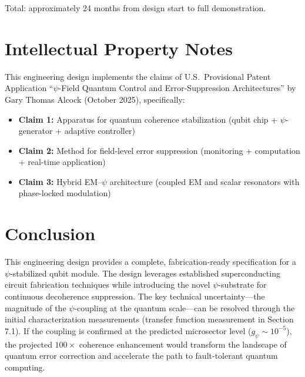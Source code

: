 \documentclass[11pt,letterpaper]{article}
\begin{document}
Total: approximately 24 months from design start to full demonstration.

\section{Intellectual Property Notes}

This engineering design implements the claims of U.S.\ Provisional Patent
Application ``$\psi$-Field Quantum Control and Error-Suppression
Architectures'' by Gary Thomas Alcock (October 2025), specifically:

\begin{itemize}
\item \textbf{Claim 1:} Apparatus for quantum coherence stabilization
(qubit chip + $\psi$-generator + adaptive controller)
\item \textbf{Claim 2:} Method for field-level error suppression
(monitoring + computation + real-time application)
\item \textbf{Claim 3:} Hybrid EM--$\psi$ architecture (coupled EM and
scalar resonators with phase-locked modulation)
\end{itemize}

\section{Conclusion}

This engineering design provides a complete, fabrication-ready
specification for a $\psi$-stabilized qubit module. The design leverages
established superconducting circuit fabrication techniques while
introducing the novel $\psi$-substrate for continuous decoherence
suppression. The key technical uncertainty---the magnitude of the
$\psi$-coupling at the quantum scale---can be resolved through the
initial characterization measurements (transfer function measurement in
Section 7.1). If the coupling is confirmed at the predicted microsector
level ($g_\psi \sim 10^{-5}$), the projected $100\times$ coherence
enhancement would transform the landscape of quantum error correction
and accelerate the path to fault-tolerant quantum computing.
\end{document}
